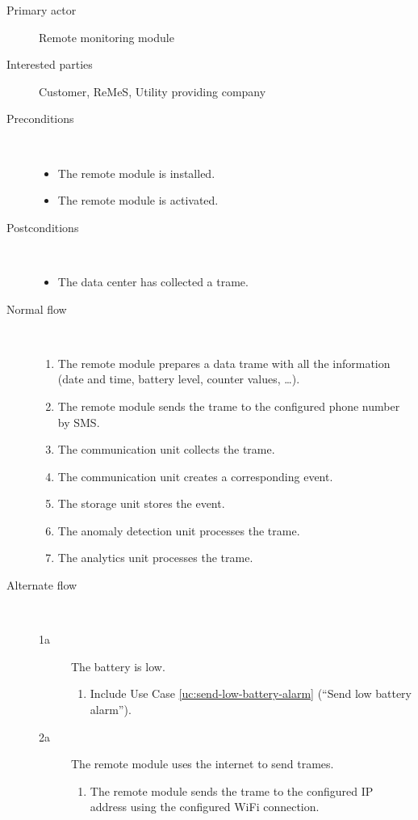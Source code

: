 \begin{description}
	\item[Primary actor] Remote monitoring module
	\item[Interested parties] Customer, ReMeS, Utility providing company 
	\item[Preconditions] \ 
	\begin{itemize}
		\item The remote module is installed.
		\item The remote module is activated.
	\end{itemize}
	\item[Postconditions] \ 
	\begin{itemize}
		\item The data center has collected a trame.
	\end{itemize}
	\item[Normal flow] \ 
	\begin{enumerate}
		\item The remote module prepares a data trame with all the information (date
		and time, battery level, counter values, \ldots).
		\item The remote module sends the trame to the configured phone number by SMS.
		\item The communication unit collects the trame.
		\item The communication unit creates a corresponding event.
		\item The storage unit stores the event. 
		\item The anomaly detection unit processes the trame.
		\item The analytics unit processes the trame.
	\end{enumerate}
	\item[Alternate flow] \ 
	\begin{description}
		\item[1a] The battery is low.
		\begin{enumerate}
			\item Include Use Case \ref{uc:send-low-battery-alarm} (``Send low battery
			alarm'').
		\end{enumerate}
		\item[2a] The remote module uses the internet to send trames.
		\begin{enumerate}
			\item The remote module sends the trame to the configured IP address using
			the configured WiFi connection.

\end{enumerate}
\end{description}
\end{description}
